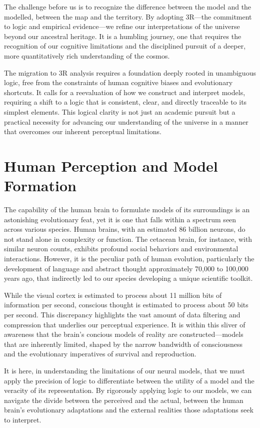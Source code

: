 \documentclass[12pt]{article}
\begin{document}
The challenge before us is to recognize the difference between the model and the modelled, between the map and the territory. By adopting 3R—the commitment to logic and empirical evidence—we refine our interpretations of the universe beyond our ancestral heritage. It is a humbling journey, one that requires the recognition of our cognitive limitations and the disciplined pursuit of a deeper, more quantitatively rich understanding of the cosmos.

The migration to 3R analysis requires a foundation deeply rooted in unambiguous logic, free from the constraints of human cognitive biases and evolutionary shortcuts. It calls for a reevaluation of how we construct and interpret models, requiring a shift to a logic that is consistent, clear, and directly traceable to its simplest elements. This logical clarity is not just an academic pursuit but a practical necessity for advancing our understanding of the universe in a manner that overcomes our inherent perceptual limitations.

\section*{Human Perception and Model Formation}
The capability of the human brain to formulate models of its surroundings is an astonishing evolutionary feat, yet it is one that falls within a spectrum seen across various species. Human brains, with an estimated 86 billion neurons, do not stand alone in complexity or function. The cetacean brain, for instance, with similar neuron counts, exhibits profound social behaviors and environmental interactions. However, it is the peculiar path of human evolution, particularly the development of language and abstract thought approximately 70,000 to 100,000 years ago, that indirectly led to our species developing a unique scientific toolkit.

While the visual cortex is estimated to process about 11 million bits of information per second, conscious thought is estimated to process about 50 bits per second. This discrepancy highlights the vast amount of data filtering and compression that underlies our perceptual experience. It is within this sliver of awareness that the brain's concious models of reality are constructed—models that are inherently limited, shaped by the narrow bandwidth of consciousness and the evolutionary imperatives of survival and reproduction.

It is here, in understanding the limitations of our neural models, that we must apply the precision of logic to differentiate between the utility of a model and the veracity of its representation. By rigorously applying logic to our models, we can navigate the divide between the perceived and the actual, between the human brain's evolutionary adaptations and the external realities those adaptations seek to interpret.
\end{document}
